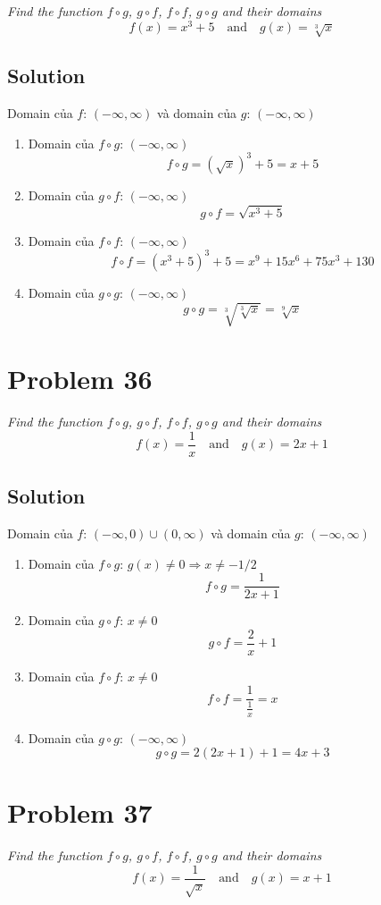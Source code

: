 \documentclass[11pt]{article}
\newcommand{\soln}{\subsection*}
\newcommand{\qn}{\textit}
\begin{document}
\qn{Find the function $f \circ g$, $g \circ f$, $f \circ f$, $g \circ g$ and their domains $$f(x)=x^3+5 \quad \text{and} \quad g(x)=\sqrt[3]{x}$$}

\soln{Solution}
Domain của $f$: $(-\infty, \infty)$ và domain của $g$: $(-\infty, \infty)$
\begin{enumerate}
	\item Domain của $f \circ g$: $(-\infty, \infty)$ $$f \circ g=(\sqrt{x})^3+5=x+5$$
	
	\item Domain của $g \circ f$: $(-\infty, \infty)$ $$g \circ f=\sqrt{x^3+5}$$
	
	\item Domain của $f \circ f$: $(-\infty, \infty)$ $$f \circ f=(x^3+5)^3+5=x^9+15x^6+75x^3+130$$
	
	\item Domain của $g \circ g$: $(-\infty, \infty)$ $$g \circ g=\sqrt[3]{\sqrt[3]{x}}=\sqrt[9]{x}$$
\end{enumerate}

\section*{Problem 36}

\qn{Find the function $f \circ g$, $g \circ f$, $f \circ f$, $g \circ g$ and their domains $$f(x)=\frac{1}{x} \quad \text{and} \quad g(x)=2x+1$$}

\soln{Solution}
Domain của $f$: $(-\infty, 0) \cup (0, \infty)$ và domain của $g$: $(-\infty, \infty)$
\begin{enumerate}
	\item Domain của $f \circ g$: $g(x) \ne 0 \Rightarrow x \ne -1/2$ $$f \circ g=\frac{1}{2x+1}$$
	
	\item Domain của $g \circ f$: $x \ne 0$ $$g \circ f=\frac{2}{x}+1$$
	
	\item Domain của $f \circ f$: $x \ne 0$ $$f \circ f=\frac{1}{\frac{1}{x}}=x$$
	
	\item Domain của $g \circ g$: $(-\infty, \infty)$ $$g \circ g=2(2x+1)+1=4x+3$$
\end{enumerate}

\section*{Problem 37}

\qn{Find the function $f \circ g$, $g \circ f$, $f \circ f$, $g \circ g$ and their domains $$f(x)=\frac{1}{\sqrt{x}} \quad \text{and} \quad g(x)=x+1$$}
\end{document}
